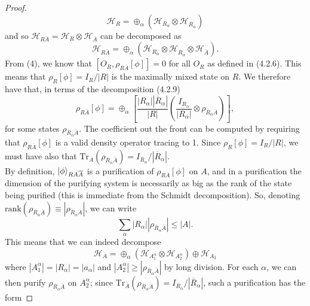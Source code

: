 \documentclass[12pt,a4paper]{report}
\numberwithin{equation}{section}
\newcommand{\ol}[1]{\overline{#1}}
\newcommand{\tr}{\text{Tr}}
\theoremstyle{definition}
\theoremstyle{theorem}
\theoremstyle{theorem}
\theoremstyle{example}
\theoremstyle{definition}
\begin{document}
\begin{proof}
	\begin{equation}
		\mathcal{H}_{R}=\oplus_{\alpha}(\mathcal{H}_{R_{\alpha}}\otimes\mathcal{H}_{\ol{R}_{\alpha}})
	\end{equation}
	and so $\mathcal{H}_{R\ol{A}}=\mathcal{H}_{R}\otimes\mathcal{H}_{\ol{A}}$ can be decomposed as
	\begin{equation}
		\mathcal{H}_{R\ol{A}}=\oplus_{\alpha}(\mathcal{H}_{R_{\alpha}}\otimes\mathcal{H}_{\ol{R}_{\alpha}}\otimes\mathcal{H}_{\ol{A}}).
	\end{equation}
	From (4), we know that $[O_{R},\rho_{R\ol{A}}[\phi]]=0$ for all $O_{R}$ as defined in (4.2.6). This means that $\rho_{R}[\phi]=I_{R}/|R|$ is the maximally mixed state on $R$. We therefore have that, in terms of the decomposition (4.2.9)
	\begin{equation}
		\rho_{R\ol{A}}[\phi]=\oplus_{\alpha}\left[\frac{|R_{\alpha}||\ol{R}_{\alpha}|}{|R|}\left(\frac{I_{R_{\alpha}}}{|R_{\alpha}|}\otimes\rho_{\ol{R}_{\alpha}\ol{A}}\right)\right],
	\end{equation}
	for some states $\rho_{\ol{R}_{\alpha}\ol{A}}$. The coefficient out the front can be computed by requiring that $\rho_{R\ol{A}}[\phi]$ is a valid density operator tracing to 1. Since $\rho_{R}[\phi]=I_{R}/|R|$, we must have also that $\tr_{\ol{A}}(\rho_{\ol{R}_{\alpha}\ol{A}})=I_{\ol{R}_{\alpha}}/|\ol{R}_{\alpha}|$.\\
	By definition, $\ket{\phi}_{RA\ol{A}}$ is a purification of $\rho_{R\ol{A}}[\phi]$ on $A$, and in a purification the dimension of the purifying system is necessarily as big as the rank of the state being purified (this is immediate from the Schmidt decomposition). So, denoting $\text{rank}(\rho_{\ol{R}_{\alpha}\ol{A}})\equiv|\rho_{\ol{R}_{\alpha}\ol{A}}|$, we can write
	\begin{equation}
		\sum_{\alpha}|R_{\alpha}||\rho_{\ol{R}_{\alpha}\ol{A}}|\leq|A|.
	\end{equation}
	This means that we can indeed decompose
	\begin{equation}
		\mathcal{H}_{A}=\oplus_{\alpha}(\mathcal{H}_{A_{1}^{\alpha}}\otimes\mathcal{H}_{A_{2}^{\alpha}})\oplus\mathcal{H}_{A_{3}}
	\end{equation}
	where $|A_{1}^{\alpha}|=|R_{\alpha}|=|a_{\alpha}|$ and $|A_{2}^{\alpha}|\geq|\rho_{\ol{R}_{\alpha}\ol{A}}|$ by long division. For each $\alpha$, we can then purify $\rho_{\ol{R}_{\alpha}\ol{A}}$ on $A_{2}^{\alpha}$; since $\tr_{\ol{A}}(\rho_{\ol{R}_{\alpha}\ol{A}})=I_{\ol{R}_{\alpha}}/|\ol{R}_{\alpha}|$, such a purification has the form

\end{proof}
\end{document}
